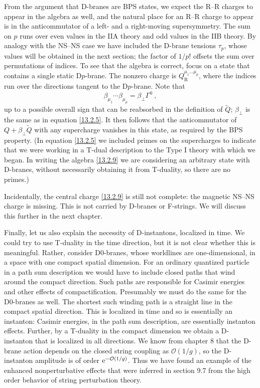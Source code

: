 From the argument that D-branes are BPS states, we expect the R--R charges to appear in the algebra as well, and the natural place for an R--R charge to appear is in the anticommutator of a left- and a right-moving supersymmetry. The sum on $p$ runs over even values in the IIA theory and odd values in the IIB theory. By analogy with the NS--NS case we have included the D-brane tensions $\tau_p$, whose values will be obtained in the next section; the factor of $1/p!$ offsets the sum over permutations of indices. To see that the algebra is correct, focus on a state that contains a single static D$p$-brane. The nonzero charge is $Q_{\mathrm{R}}^{\mu_1\dots\mu_p}$, where the indices run over the directions tangent to the D$p$-brane. Note that
\begin{equation}
	\beta_{\mu_1}\cdots\beta_{\mu_p} = \beta_\perp\Gamma^0 \:, \label{13.2.10}
\end{equation}
up to a possible overall sign that can be reabsorbed in the definition of $\tilde{Q}$; $\beta_\perp$ is the same as in equation \eqref{13.2.5}. It then follows that the anticommutator of $Q + \beta_\perp\tilde{Q}$ with any supercharge vanishes in this state, as required by the BPS property. (In equation \eqref{13.2.5} we included primes on the supercharges to indicate that we were working in a T-dual description to the Type I theory with which we began. In writing the algebra \eqref{13.2.9} we are considering an arbitrary state with D-branes, without necessarily obtaining it from T-duality, so there are no primes.)

Incidentally, the central charge \eqref{13.2.9} is still not complete: the magnetic NS--NS charge is missing. This is not carried by D-branes or F-strings. We will discuss this further in the next chapter.

Finally, let us also explain the necessity of D-instantons, localized in time. We could try to use T-duality in the time direction, but it is not clear whether this is meaningful. Rather, consider D0-branes, whose worldlines are one-dimensional, in a space with one compact spatial dimension. For an ordinary quantized particle in a path sum description we would have to include closed paths that wind around the compact direction. Such paths are responsible for Casimir energies and other effects of compactification. Presumably we must do the same for the D0-branes as well. The shortest such winding path is a straight line in the compact spatial direction. This is localized in time and so is essentially an instanton: Casimir energies, in the path sum description, are essentially instanton effects. Further, by a T-duality in the compact dimension we obtain a D-instanton that is localized in all directions. We know from chapter 8 that the D-brane action depends on the closed string coupling as $\mathcal{O}(1/g)$, so the D-instanton amplitude is of order $\mathrm{e}^{-\mathcal{O}(1/g)}$. Thus we have found an example of the enhanced nonperturbative effects that were inferred in section 9.7 from the high order behavior of string perturbation theory.


